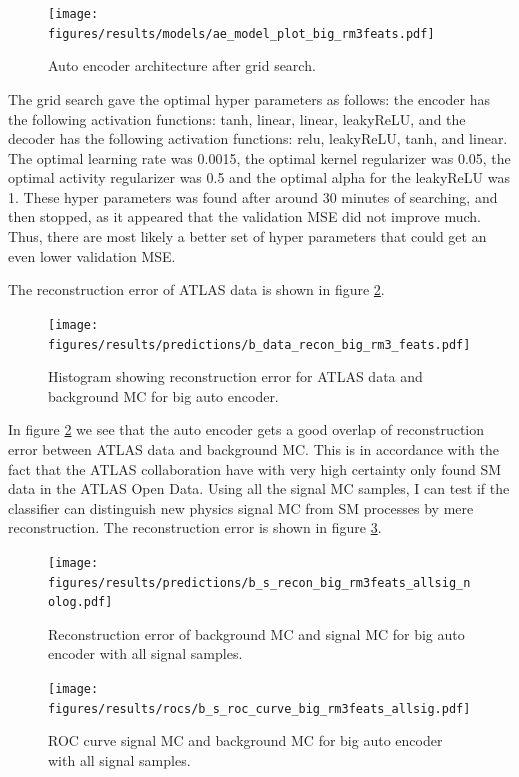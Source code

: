 \documentclass[ reprint, amsmath,amssymb, aps, nofootinbib]{revtex4-2}
\begin{document}
\begin{figure}[H]
    \centering
    \texttt{[image: figures/results/models/ae\_model\_plot\_big\_rm3feats.pdf]}
    \caption{Auto encoder architecture after grid search. }
    \label{fig:big_ae_plot}
\end{figure}
The grid search gave the optimal hyper parameters as follows: the encoder has the following activation functions: tanh, linear, linear, leakyReLU, and the decoder has the following activation functions: relu, leakyReLU, tanh, and linear. The optimal learning rate was 0.0015, the optimal kernel regularizer was 0.05, the optimal activity regularizer was 0.5 and the optimal alpha for the leakyReLU was 1. These hyper parameters was found after around 30 minutes of searching, and then stopped, as it appeared that the validation MSE did not improve much. Thus, there are most likely a better set of hyper parameters that could get an even lower validation MSE. \par 
The reconstruction error of ATLAS data is shown in figure \ref{fig:data_b_big_pred}.

\begin{figure}[H]
     \centering
         \texttt{[image: figures/results/predictions/b\_data\_recon\_big\_rm3\_feats.pdf]}
         \caption{Histogram showing reconstruction error for ATLAS data and background MC for big auto encoder. }
     \label{fig:data_b_big_pred}
\end{figure}

In figure \ref{fig:data_b_big_pred} we see that the auto encoder gets a good overlap of reconstruction error between ATLAS data and background MC. This is in accordance with the fact that the ATLAS collaboration have with very high certainty only found SM data in the ATLAS Open Data. Using all the signal MC samples, I can test if the classifier can distinguish new physics signal MC from SM processes by mere reconstruction. The reconstruction error is shown in figure \ref{fig:s_b_big_pred_allsig}.


\begin{figure}[H]
     \centering
         \texttt{[image: figures/results/predictions/b\_s\_recon\_big\_rm3feats\_allsig\_nolog.pdf]}
    \caption{Reconstruction error of background MC and signal MC for big auto encoder with all signal samples.  }
    \label{fig:s_b_big_pred_allsig}
\end{figure}


\begin{figure}[H]    
    
    \centering
         \texttt{[image: figures/results/rocs/b\_s\_roc\_curve\_big\_rm3feats\_allsig.pdf]}
         \caption{ROC curve signal MC and background MC for big auto encoder with all signal samples.}
         \label{fig:s_b_big_roc_allsig}
\end{figure}
\end{document}
